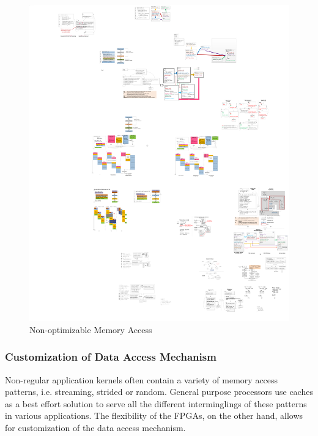 \begin{figure}[htp]
\begin{center}
\includegraphics[width=1.0\linewidth]{chap3fig/memDepCycle.pdf}
\caption{Non-optimizable Memory Access
\label{fig:memInDepCyc}}
\end{center}
\end{figure}



\subsubsection{Customization of Data Access Mechanism}
Non-regular application kernels often contain a variety of
memory access patterns, i.e. streaming, strided or random.
General purpose processors use caches as a best effort solution
to serve all the different interminglings of these patterns in
various applications. The flexibility of the FPGAs, on the other
hand, allows for customization of the data access mechanism.




